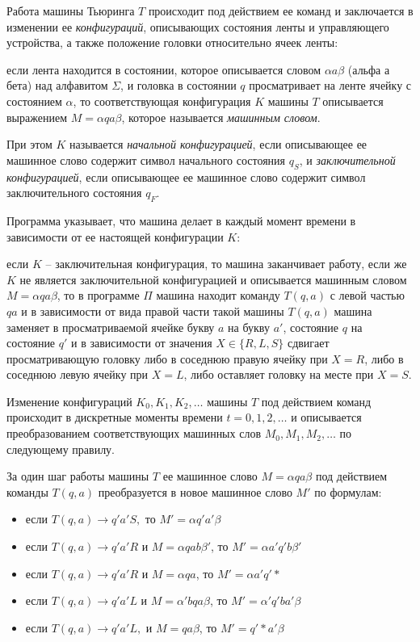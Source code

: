 Работа машины Тьюринга $T$ происходит под действием ее команд и заключается в изменении ее \textit{конфигураций}, описывающих состояния ленты и управляющего устройства, а также положение головки относительно ячеек ленты:

если лента находится в состоянии, которое описывается словом $\alpha a\beta$ (альфа а бета) над алфавитом $\Sigma$, и головка в состоянии $q$ просматривает на ленте ячейку с состоянием $\alpha$, то соответствующая конфигурация $K$ машины $T$ описывается выражением $M=\alpha qa\beta$, которое называется \textit{машинным словом}.

При этом $K$ называется \textit{начальной конфигурацией}, если описывающее ее машинное слово содержит символ начального состояния $q_S$, и \textit{заключительной конфигурацией}, если описывающее ее машинное слово содержит символ заключительного состояния $q_F$.

Программа указывает, что машина делает в каждый момент времени в зависимости от ее настоящей конфигурации $K$:

если $K$ -- заключительная конфигурация, то машина заканчивает работу, если же $K$ не является заключительной конфигурацией и описывается машинным словом $M=\alpha qa \beta$, то в программе $\Pi$ машина находит команду $T(q,a)$ с левой частью $qa$ и в зависимости от вида правой части такой машины $T(q,a)$ машина заменяет в просматриваемой ячейке букву $a$ на букву $a'$, состояние $q$ на состояние $q'$ и в зависимости от значения $X\in\{R,L,S\}$ сдвигает просматривающую головку либо в соседнюю правую ячейку при $X=R$, либо в соседнюю левую ячейку при $X=L$, либо оставляет головку на месте при $X=S$.

Изменение конфигураций $K_0,K_1,K_2,\ldots$ машины $T$ под действием команд происходит в дискретные моменты времени $t=0,1,2,\ldots$ и описывается преобразованием соответствующих машинных слов $M_0,M_1,M_2,\ldots$ по следующему правилу.

За один шаг работы машины $T$ ее машинное слово $M=\alpha qa \beta$ под действием команды $T(q,a)$ преобразуется в новое машинное слово $M'$ по формулам:

\begin{itemize}
    \item если $T(q,a)\rightarrow q'a'S,$ то $M'=\alpha q'a'\beta$
    \item если $T(q,a)\rightarrow q'a'R$ и $M=\alpha qab \beta'$, то $M'=\alpha a'q'b\beta'$
    \item если $T(q,a)\rightarrow q'a'R$ и $M=\alpha qa$, то $M'=\alpha a'q'*$
    \item если  $T(q,a)\rightarrow q'a'L$ и $M = \alpha' bqa \beta$, то $M'=\alpha' q'ba'\beta$
    \item если $T(q,a)\rightarrow q'a'L,$  и $M=qa\beta$, то $M'=q'*a'\beta$
\end{itemize}


